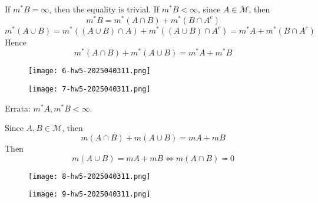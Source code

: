 If $m^{*}B=\infty$, then the equality is trivial. If $m^{*}B<\infty$, since $A\in \mathcal{M}$, then
\[
m^{*}B=m^{*}(A\cap B)+m^{*}(B\cap A^{c})
\]
\[
m^{*}(A\cup B)=m^{*}((A\cup B)\cap A)+m^{*}((A\cup B)\cap A^{c})=m^{*}A+m^{*}(B\cap A^{c})
\]
Hence
\[
m^{*}(A\cap B)+m^{*}(A\cup B)=m^{*}A+m^{*}B
\]
\begin{figure}[H]
\centering
\texttt{[image: 6-hw5-2025040311.png]}
\label{}
\end{figure}
\begin{figure}[H]
\centering
\texttt{[image: 7-hw5-2025040311.png]}
\label{}
\end{figure}

Errata: $m^{*}A,m^{*}B<\infty$.

Since $A, B\in \mathcal{M}$, then
\[
m(A\cap B)+m(A\cup B)=mA+mB
\]
Then
\[
m(A\cup B)=mA+mB\iff m(A\cap B)=0
\]
\begin{figure}[H]
\centering
\texttt{[image: 8-hw5-2025040311.png]}
\label{}
\end{figure}
\begin{figure}[H]
\centering
\texttt{[image: 9-hw5-2025040311.png]}
\label{}
\end{figure}

